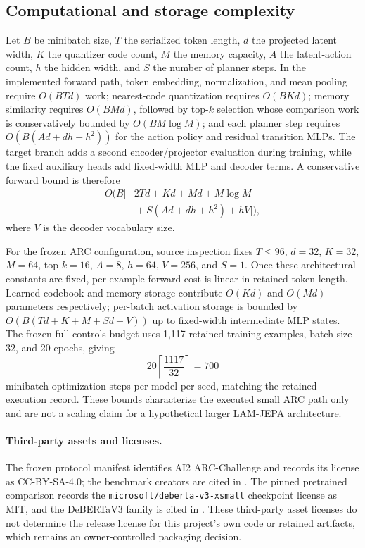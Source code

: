 \subsection{Computational and storage complexity}
Let $B$ be minibatch size, $T$ the serialized token length, $d$ the projected latent width, $K$ the quantizer code count, $M$ the memory capacity, $A$ the latent-action count, $h$ the hidden width, and $S$ the number of planner steps. In the implemented forward path, token embedding, normalization, and mean pooling require $O(BTd)$ work; nearest-code quantization requires $O(BKd)$; memory similarity requires $O(BMd)$, followed by top-$k$ selection whose comparison work is conservatively bounded by $O(BM\log M)$; and each planner step requires $O(B(Ad+dh+h^2))$ for the action policy and residual transition MLPs. The target branch adds a second encoder/projector evaluation during training, while the fixed auxiliary heads add fixed-width MLP and decoder terms. A conservative forward bound is therefore
\[
\begin{aligned}
O\bigl(B[&2Td+Kd+Md+M\log M\\
       &{}+S(Ad+dh+h^2)+hV]\bigr),
\end{aligned}
\]
where $V$ is the decoder vocabulary size.

For the frozen ARC configuration, source inspection fixes $T\leq96$, $d=32$, $K=32$, $M=64$, top-$k=16$, $A=8$, $h=64$, $V=256$, and $S=1$. Once these architectural constants are fixed, per-example forward cost is linear in retained token length. Learned codebook and memory storage contribute $O(Kd)$ and $O(Md)$ parameters respectively; per-batch activation storage is bounded by $O(B(Td+K+M+Sd+V))$ up to fixed-width intermediate MLP states. The frozen full-controls budget uses 1,117 retained training examples, batch size 32, and 20 epochs, giving
\[
20\left\lceil\frac{1117}{32}\right\rceil=700
\]
minibatch optimization steps per model per seed, matching the retained execution record. These bounds characterize the executed small ARC path only and are not a scaling claim for a hypothetical larger LAM-JEPA architecture.

\paragraph{Third-party assets and licenses.}
The frozen protocol manifest identifies AI2 ARC-Challenge and records its license as CC-BY-SA-4.0; the benchmark creators are cited in \citet{clark2018arc}. The pinned pretrained comparison records the \texttt{microsoft/deberta-v3-xsmall} checkpoint license as MIT, and the DeBERTaV3 family is cited in \citet{he2023debertav3}. These third-party asset licenses do not determine the release license for this project's own code or retained artifacts, which remains an owner-controlled packaging decision.
